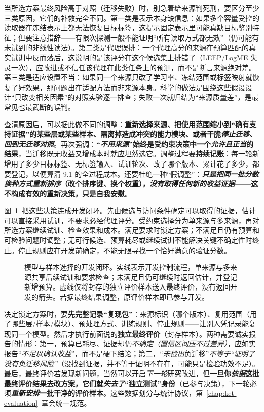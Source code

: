 当所选方案最终风险高于对照（迁移失败）时，别急着给来源判死刑，要区分至少三类原因，它们的补救完全不同。第一类是表示本身缺信息：如果多个容量受控的读取器在冻结表示上都无法恢复目标标签，这提示固定表示里可能真缺目标鉴别特征；但要注意措辞——有限次探测一般不能证明“所有读取方式都无效”（仍可能有未试到的非线性读法）。第二类是代理误排：一个代理高分的来源在预算匹配的真实试训中反而落后，这说明的是该评分在这个候选集上排错了（LEEP/LogME 失灵一次），应改进或不信任该代理在此类任务上的预测，而不是断言来源绝对差。第三类是适应设置不当：如果同一个来源只改了学习率、冻结范围或标签映射就恢复了好效果，那问题出在适配方法而非来源本身。科学的做法是围绕这些假设设计“只改变相关因素”的对照实验逐一排查；失败一次就归结为“来源质量差”，是最常见也最武断的误判。

查清原因后，可以据此做不同的调整：\textbf{重新选择来源、把使用范围缩小到“确有支持证据”的某些层或某些样本、隔离掉造成冲突的能力模块、或者干脆\emph{停止迁移、回到无迁移对照}}。再次强调：\textbf{“\emph{不用来源}”始终是受约束决策中一个\emph{允许且正当}的结果}，当迁移既无收益又增成本时就应坦然选它。调整过程要\textbf{持续记账}：每一轮新增用了多少目标标签、无标签输入、试训轮次、改了哪个版本、累计花了多少，都要登记，以便算清 9.1 的全过程成本。还要杜绝一种“假调整”：\textbf{\emph{只是把\emph{同一批}分数\emph{换种方式重新排序}}（改个排序键、换个权重），\emph{没有取得任何\emph{新的}收益证据}——这不构成有效的重新决策，只是自我安慰}。

图~\ref{fig:ket-reuse-selection-loop}~把这些决策连成开发闭环。先由候选与访问条件确定可以取得的证据，估计可以直接采用试训，不要求必经代理评分。受约束选择分为单来源与多来源，再对所选方案继续试训、检查效果和成本。满足要求时锁定方案；不满足且仍有预算和可检验问题时调整；无可行候选、预算耗尽或继续试训不能解决关键不确定性时终止。停止规则应在开发前确定，不能无限寻找一个恰好满意的验证分数。

\begin{figure}[htbp]
  \centering
  
  \caption{模型与样本选择的开发闭环。实线表示开发控制流程，单来源与多来源共享后续试训和要求检查；未满足且仍可继续时返回估计，并登记新增预算。虚线仅将封存的独立评价样本送入最终评价，没有返回开发的箭头。若据最终结果调整，原评价样本即已参与开发。}
  \label{fig:ket-reuse-selection-loop}
\end{figure}

决定锁定方案时，要\textbf{先完整记录“复现包”}：来源标识（哪个版本）、复用范围（用了哪些层/样本/模块）、预处理方式、训练规则、停止规则——让别人凭记录能复现同一个模型。然后才执行前面说的\textbf{独立最终评价}（封存样本）。两种需要诚实报告的情形：第一，预算已耗尽、证据却仍\emph{不确定（置信区间压不过差异）}，应如实报告“\emph{不足以确认收益}”，而不是硬下结论；第二，“\emph{未检出}负迁移”\emph{不等于“证明了\emph{没有}负迁移风险”}（没找到证据，并不等于证明不存在，可能只是检验功效不足）。最后，最终评价若发现新问题，当然可以开启\emph{下一轮}研究改进，但\textbf{一旦你\emph{依据}这批最终评价结果去改方案，它们就\emph{失去了}“独立测试”身份}（已参与决策），下一轮必须\textbf{\emph{重新安排}一批干净的评价样本}。这些数据划分与统计协议，第~\ref{chap:ket-evaluation}~章会统一规范。

